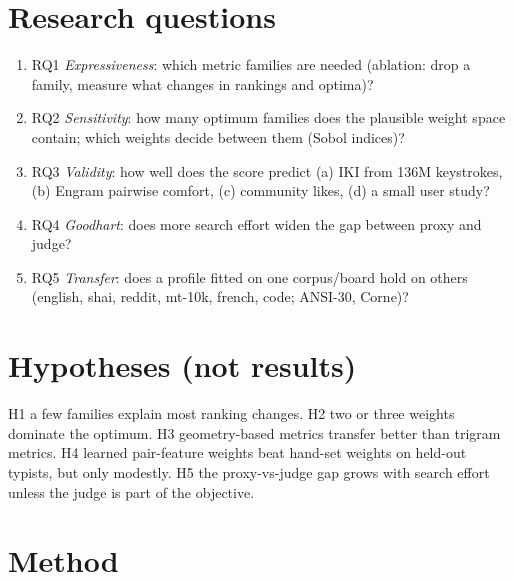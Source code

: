 \documentclass{gecko-paper}
\begin{document}
\begin{paperbody}
\section{Research questions}

\begin{enumerate}
\def\labelenumi{\arabic{enumi}.}
\setlength{\itemsep}{1pt}\setlength{\parskip}{0pt}
\item
  RQ1 \emph{Expressiveness}: which metric families are needed (ablation:
  drop a family, measure what changes in rankings and optima)?
\item
  RQ2 \emph{Sensitivity}: how many optimum families does the plausible
  weight space contain; which weights decide between them (Sobol
  indices)?
\item
  RQ3 \emph{Validity}: how well does the score predict (a) IKI from 136M
  keystrokes, (b) Engram pairwise comfort, (c) community likes, (d) a
  small user study?
\item
  RQ4 \emph{Goodhart}: does more search effort widen the gap between
  proxy and judge?
\item
  RQ5 \emph{Transfer}: does a profile fitted on one corpus/board hold on
  others (english, shai, reddit, mt-10k, french, code; ANSI-30, Corne)?
\end{enumerate}

\section{Hypotheses (not results)}

H1 a few families explain most ranking changes. H2 two or three weights
dominate the optimum. H3 geometry-based metrics transfer better than
trigram metrics. H4 learned pair-feature weights beat hand-set weights
on held-out typists, but only modestly. H5 the proxy-vs-judge gap grows
with search effort unless the judge is part of the objective.

\section{Method}


\end{paperbody}
\end{document}
